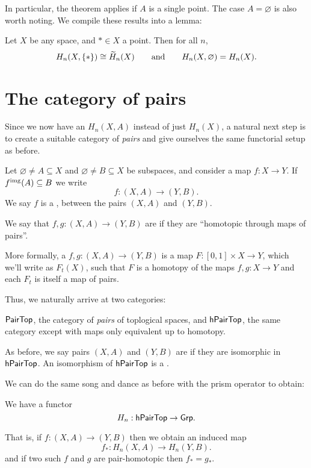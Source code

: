 In particular, the theorem applies if $A$ is a single point.
The case $A = \varnothing$ is also worth noting.
We compile these results into a lemma:
\begin{lemma}
	Let $X$ be any space, and $\ast \in X$ a point. Then for all $n$,
	\[
		H_n(X, \{\ast\}) \cong \widetilde H_n(X)
		\qquad\text{and}\qquad
		H_n(X, \varnothing) = H_n(X).
	\]
\end{lemma}

\section{The category of pairs}
Since we now have an $H_n(X,A)$ instead of just $H_n(X)$,
a natural next step is to create a suitable category of \emph{pairs}
and give ourselves the same functorial setup as before.

\begin{definition}
	Let $\varnothing \neq A \subseteq X$ and $\varnothing \neq B \subseteq X$
	be subspaces, and consider a map $f : X \to Y$.
	If $f^{\text{img}}(A) \subseteq B$ we write
	\[ f : (X,A) \to (Y,B). \]
	We say $f$ is a ,
	between the pairs $(X,A)$ and $(Y,B)$.
\end{definition}
\begin{definition}
	We say that $f,g : (X,A) \to (Y,B)$ are  if they
	are ``homotopic through maps of pairs''.

	More formally, a 
	$f, g : (X,A) \to (Y,B)$ is a map $F : [0,1] \times X \to Y$,
	which we'll write as $F_t(X)$, such that
	$F$ is a homotopy of the maps $f,g : X \to Y$
	and each $F_t$ is itself a map of pairs.
\end{definition}
Thus, we naturally arrive at two categories:
\begin{itemize}
	\ii $\mathsf{PairTop}$, the category of \emph{pairs} of
	toplogical spaces, and
	\ii $\mathsf{hPairTop}$, the same category except
	with maps only equivalent up to homotopy.
\end{itemize}
\begin{definition}
	As before, we say pairs $(X,A)$ and $(Y,B)$ are
	if they are isomorphic in $\mathsf{hPairTop}$.
	An isomorphism of $\mathsf{hPairTop}$ is a
	.
\end{definition}

We can do the same song and dance as before with the prism operator to obtain:
\begin{lemma}
	We have a functor 
	\[ H_n : \mathsf{hPairTop} \to \mathsf{Grp}. \]
\end{lemma}
That is, if $f : (X,A) \to (Y,B)$ then we obtain an induced map
\[ f_\ast : H_n(X,A) \to H_n(Y,B). \]
and if two such $f$ and $g$ are pair-homotopic
then $f_\ast = g_\ast$.

